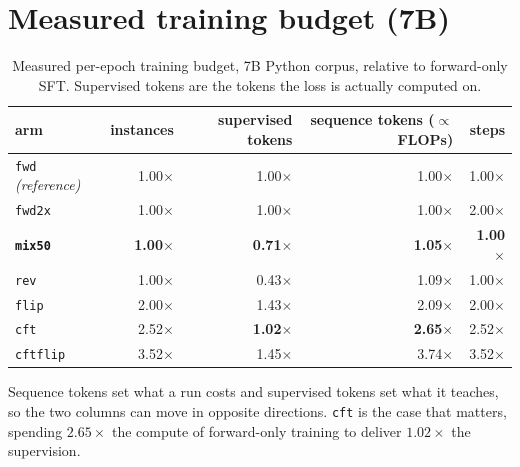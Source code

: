 \documentclass{article}
\newcommand{\arm}[1]{\texttt{#1}}
\begin{document}
\section{Measured training budget (7B)}
\label{app:cost}
\begin{table}[h]
\centering\small
\caption{Measured per-epoch training budget, 7B Python corpus, relative to forward-only
SFT. Supervised tokens are the tokens the loss is actually computed on.}
\label{tab:cost}
\begin{tabular}{lrrrr}
\toprule
arm & instances & supervised tokens & sequence tokens ($\propto$ FLOPs) & steps \\
\midrule
\arm{fwd} \emph{(reference)} & 1.00$\times$ & 1.00$\times$ & 1.00$\times$ & 1.00$\times$ \\
\arm{fwd2x} & 1.00$\times$ & 1.00$\times$ & 1.00$\times$ & 2.00$\times$ \\
\textbf{\arm{mix50}} & \textbf{1.00$\times$} & \textbf{0.71$\times$} & \textbf{1.05$\times$} & \textbf{1.00$\times$} \\
\arm{rev} & 1.00$\times$ & 0.43$\times$ & 1.09$\times$ & 1.00$\times$ \\
\arm{flip} & 2.00$\times$ & 1.43$\times$ & 2.09$\times$ & 2.00$\times$ \\
\arm{cft} & 2.52$\times$ & \textbf{1.02$\times$} & \textbf{2.65$\times$} & 2.52$\times$ \\
\arm{cftflip} & 3.52$\times$ & 1.45$\times$ & 3.74$\times$ & 3.52$\times$ \\
\bottomrule
\end{tabular}
\end{table}
Sequence tokens set what a run costs and supervised tokens set what it teaches, so the two
columns can move in opposite directions. \arm{cft} is the case that matters, spending
$2.65\times$ the compute of forward-only training to deliver $1.02\times$ the supervision.
\end{document}
